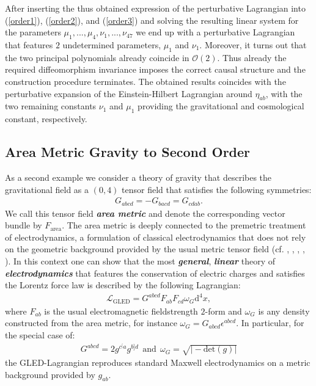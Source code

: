 \documentclass[%
 reprint,
nofootinbib,
 amsmath,amssymb,
 aps,
 prd,
floatfix,
]{revtex4-2}
\begin{document}
After inserting the thus obtained expression of the perturbative Lagrangian into (\ref{order1}), (\ref{order2}), and (\ref{order3}) and solving the resulting linear system for the parameters $\mu_1, ..., \mu_4, \nu_1, ..., \nu_{47}$ we end up with a perturbative Lagrangian that features $2$ undetermined parameters, $\mu_1$ and $\nu_1$. 
Moreover, it turns out that the two principal polynomials already coincide in $\mathcal{O}(2)$. 
Thus already the required diffeomorphism invariance imposes the correct causal structure and the construction procedure terminates. 
The obtained results coincides with the perturbative expansion of the Einstein-Hilbert Lagrangian around $\eta_{ab}$, with the two remaining constants $\nu_1$ and $\mu_1$ providing the gravitational and cosmological constant, respectively.
\subsection{Area Metric Gravity to Second Order}
As a second example we consider a theory of gravity that describes the gravitational field as a $(0,4)$ tensor field that satisfies the following symmetries:
\begin{align}\label{areaSym}
    G_{abcd} = -G_{bacd} = G_{cdab}.
\end{align}
We call this tensor field \textit{\textbf{area metric}} and denote the corresponding vector bundle by $F_{\text{area}}$. 
The area metric is deeply connected to the premetric treatment of electrodynamics, a formulation of classical electrodynamics that does not rely on the geometric background provided by the usual metric tensor field (cf. \cite{hehl2003foundations}, \cite{Hehl2005}, \cite{2004PhRvD..70j5022L}, \cite{1999PhLB..458..466O}, \cite{2009JPhA...42U5402I}).
In this context one can show that the most \textit{\textbf{general}}, \textit{\textbf{linear}} theory of \textit{\textbf{electrodynamics}} that features the conservation of electric charges and satisfies the Lorentz force law is described by the following Lagrangian:
\begin{align}
    \mathcal{L}_{\text{GLED}} =  G^{abcd}F_{ab}F_{cd}\omega_G\mathrm{d}^4x,
\end{align}
where $F_{ab}$ is the usual electromagnetic fieldstrength $2$-form and $\omega_G$ is any density constructed from the area metric, for instance $\omega_G = G_{abcd}\epsilon^{abcd}$. 
In particular, for the special case of:
\begin{align}
    G^{abcd} = 2 g^{c^[a}g^{b]d} \ \ \text{and} \ \  \omega_{G}=\sqrt{\vert -\mathrm{det}(g) \vert}
\end{align}
the GLED-Lagrangian reproduces standard Maxwell electrodynamics on a metric background provided by $g_{ab}$.
\end{document}
